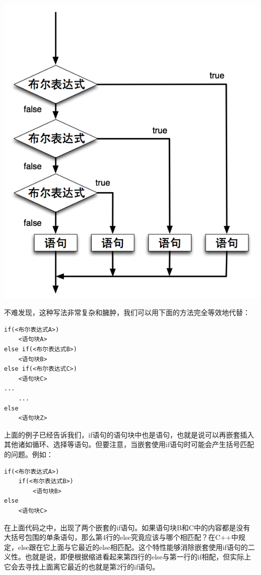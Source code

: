\begin{center}
\includegraphics{fig/1-6/1_if_statement.png}
\end{center}

不难发现，这种写法非常复杂和臃肿，我们可以用下面的方法完全等效地代替：

\begin{lstlisting}[xleftmargin=10em,xrightmargin=10em]
if(<布尔表达式A>)
    <语句块A>
else if(<布尔表达式B>)
    <语句块B>
else if(<布尔表达式C>)
    <语句块C>
...
	...
else
    <语句块Z>
\end{lstlisting}

上面的例子已经告诉我们，if语句的语句块中也是语句，也就是说可以再嵌套插入其他诸如循环、选择等语句。但要注意，当嵌套使用if语句时可能会产生括号匹配的问题。例如：

\begin{lstlisting}[xleftmargin=10em,xrightmargin=10em]
if(<布尔表达式A>)
    if(<布尔表达式B>)
        <语句块B>
else
    <语句块C>
\end{lstlisting}

在上面代码之中，出现了两个嵌套的if语句。如果语句块B和C中的内容都是没有大括号包围的单条语句，那么第4行的else究竟应该与哪个相匹配？在C++中规定，else跟在它上面与它最近的else相匹配。这个特性能够消除嵌套使用if语句的二义性。也就是说，即便根据缩进看起来第四行的else与第一行的if相配，但实际上它会去寻找上面离它最近的也就是第2行的if语句。

